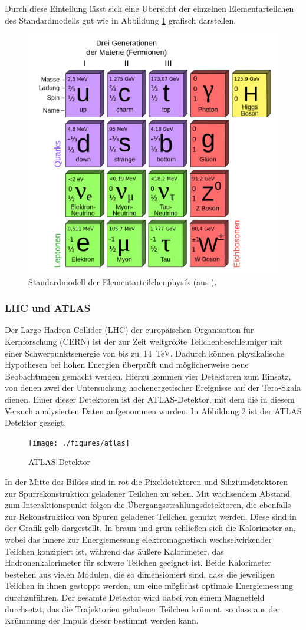 \documentclass[11pt, a4paper]{article}
\numberwithin{equation}{section}
\begin{document}
Durch diese Einteilung lässt sich eine Übersicht der einzelnen Elementarteilchen des Standardmodells gut wie in Abbildung \ref{fig:standardmodell} grafisch darstellen.
\begin{figure}[htbp]
	\centering
	\includegraphics[width=.6\textwidth]{./figures/standardmodell}
	\caption{Standardmodell der Elementarteilchenphysik (aus \cite{wiki_standardmodell}).}
	\label{fig:standardmodell}
\end{figure}

\subsubsection{LHC und ATLAS}

Der Large Hadron Collider (LHC) der europäischen Organisation für Kernforschung (CERN) ist der zur Zeit weltgrößte Teilchenbeschleuniger mit einer Schwerpunktsenergie von bis zu~\SI{14}{TeV}.
Dadurch können physikalische Hypothesen bei hohen Energien überprüft und möglicherweise neue Beobachtungen gemacht werden.
Hierzu kommen vier Detektoren zum Einsatz, von denen zwei der Untersuchung hochenergetischer Ereignisse auf der Tera-Skala dienen.
Einer dieser Detektoren ist der ATLAS-Detektor, mit dem die in diesem Versuch analysierten Daten aufgenommen wurden.
In Abbildung \ref{fig:atlas} ist der ATLAS Detektor gezeigt.
\begin{figure}[htbp]
	\centering
	\texttt{[image: ./figures/atlas]}
	\caption{ATLAS Detektor}
	\label{fig:atlas}
\end{figure}
In der Mitte des Bildes sind in rot die Pixeldetektoren und Siliziumdetektoren zur Spurrekonstruktion geladener Teilchen zu sehen.
Mit wachsendem Abstand zum Interaktionspunkt folgen die Übergangsstrahlungsdetektoren, die ebenfalls zur Rekonstruktion von Spuren geladener Teilchen genutzt werden.
Diese sind in der Grafik gelb dargestellt.
In braun und grün schließen sich die Kalorimeter an, wobei das innere zur Energiemessung elektromagnetisch wechselwirkender Teilchen konzipiert ist, während das äußere Kalorimeter, das Hadronenkalorimeter für schwere Teilchen geeignet ist.
Beide Kalorimeter bestehen aus vielen Modulen, die so dimensioniert sind, dass die jeweiligen Teilchen in ihnen gestoppt werden, um eine möglichst optimale Energiemessung durchzuführen.
Der gesamte Detektor wird dabei von einem Magnetfeld durchsetzt, das die Trajektorien geladener Teilchen krümmt, so dass aus der Krümmung der Impuls dieser bestimmt werden kann.
\end{document}
